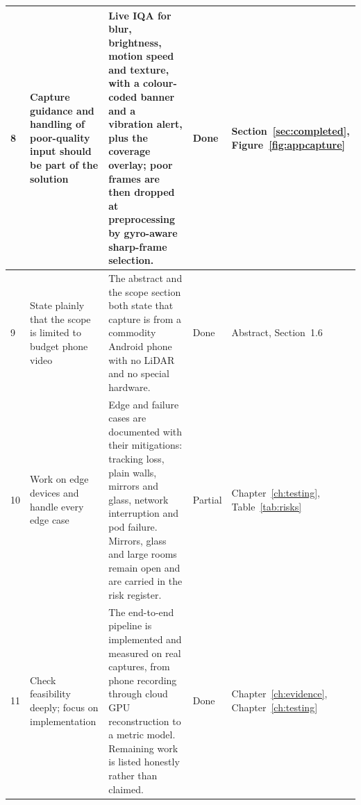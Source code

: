 {\begin{longtable}{p{}p{}p{}p{}p{}}
\midrule
8 & Capture guidance and handling of poor-quality input should be part of the solution & Live IQA for blur, brightness, motion speed and texture, with a colour-coded banner and a vibration alert, plus the coverage overlay; poor frames are then dropped at preprocessing by gyro-aware sharp-frame selection. & Done & Section~\ref{sec:completed}, Figure~\ref{fig:appcapture} \\
\midrule
9 & State plainly that the scope is limited to budget phone video & The abstract and the scope section both state that capture is from a commodity Android phone with no LiDAR and no special hardware. & Done & Abstract, Section~1.6 \\
\midrule
10 & Work on edge devices and handle every edge case & Edge and failure cases are documented with their mitigations: tracking loss, plain walls, mirrors and glass, network interruption and pod failure. Mirrors, glass and large rooms remain open and are carried in the risk register. & Partial & Chapter~\ref{ch:testing}, Table~\ref{tab:risks} \\
\midrule
11 & Check feasibility deeply; focus on implementation & The end-to-end pipeline is implemented and measured on real captures, from phone recording through cloud GPU reconstruction to a metric model. Remaining work is listed honestly rather than claimed. & Done & Chapter~\ref{ch:evidence}, Chapter~\ref{ch:testing} \\
\bottomrule
\end{longtable}
}
